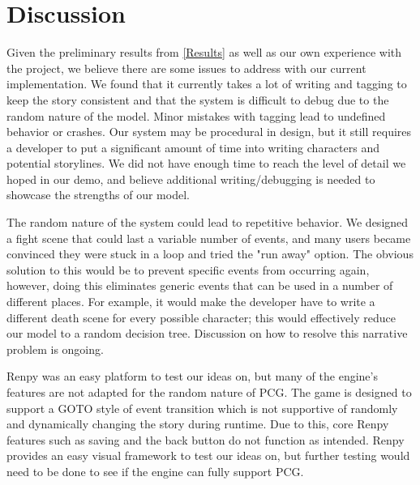 \section{Discussion} \label{Discussion}
Given the preliminary results from \ref{Results} as well as our own experience with the project, we believe there are some issues to address with our current implementation. We found that it currently takes a lot of writing and tagging to keep the story consistent and that the system is difficult to debug due to the random nature of the model. Minor mistakes with tagging lead to undefined behavior or crashes. Our system may be procedural in design, but it still requires a developer to put a significant amount of time into writing characters and potential storylines. We did not have enough time to reach the level of detail we hoped in our demo, and believe additional writing/debugging is needed to showcase the strengths of our model.

The random nature of the system could lead to repetitive behavior. We designed a fight scene that could last a variable number of events, and many users became convinced they were stuck in a loop and tried the "run away" option. The obvious solution to this would be to prevent specific events from occurring again, however, doing this eliminates generic events that can be used in a number of different places. For example, it would make the developer have to write a different death scene for every possible character; this would effectively reduce our model to a random decision tree. Discussion on how to resolve this narrative problem is ongoing.

Renpy was an easy platform to test our ideas on, but many of the engine's features are not adapted for the random nature of PCG. The game is designed to support a GOTO style of event transition which is not supportive of randomly and dynamically changing the story during runtime. Due to this, core Renpy features such as saving and the back button do not function as intended. Renpy provides an easy visual framework to test our ideas on, but further testing would need to be done to see if the engine can fully support PCG.
